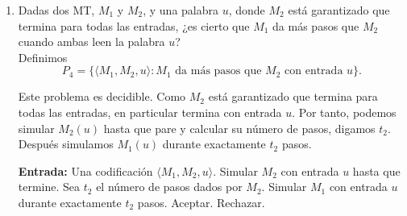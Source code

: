 \documentclass[12pt]{article}
\begin{document}
\begin{ejercicio}[2.4 puntos]
\begin{enumerate}
            Si $M$ no acepta $w$, entonces $N_1$ no acepta ninguna palabra. Por tanto,
            la condición de $P_3$ se cumple trivialmente, ya que no hay palabras aceptadas
            por $N_1$. \\

            Si $M$ acepta $w$, entonces $N_1$ acepta $\varepsilon$ en cierto número $t_1$
            de pasos, pero $N_2$ no acepta $\varepsilon$ en ningún número de pasos. Por
            tanto, la condición de $P_3$ falla. \\

            Así,
            $$
            \langle M,w\rangle\in C\text{-UNIVERSAL}
            \Longleftrightarrow
            \langle N_1,N_2\rangle\in P_3.
            $$

            Luego $C\text{-UNIVERSAL}\propto P_3$. Como $C\text{-UNIVERSAL}$ no es
            semidecidible, $P_3$ no es semidecidible. En particular, $P_3$ no es decidible.

            \newpage

            \item Dadas dos MT, $M_1$ y $M_2$, y una palabra $u$, donde $M_2$ está garantizado que termina para todas las entradas, 
            ¿es cierto que $M_1$ da más pasos que $M_2$ cuando ambas leen la palabra $u$? \\

            Definimos
            $$
            P_4=\{\langle M_1,M_2,u\rangle : M_1 \text{ da más pasos que } M_2
            \text{ con entrada } u\}.
            $$

            Este problema es decidible. Como $M_2$ está garantizado que termina para todas
            las entradas, en particular termina con entrada $u$. Por tanto, podemos simular
            $M_2(u)$ hasta que pare y calcular su número de pasos, digamos $t_2$. \\

            Después simulamos $M_1(u)$ durante exactamente $t_2$ pasos.

            \begin{algorithm}
            \caption{$M_{P_4}$}
            \label{algorithm:p4-decidible}
            \begin{algorithmic}
            \State \textbf{Entrada:} Una codificación $\langle M_1,M_2,u\rangle$.
            \State Simular $M_2$ con entrada $u$ hasta que termine.
            \State Sea $t_2$ el número de pasos dados por $M_2$.
            \State Simular $M_1$ con entrada $u$ durante exactamente $t_2$ pasos.
                \State Aceptar.
            \Else
                \State Rechazar.
            \EndIf
            \end{algorithmic}
            \end{algorithm}


\end{enumerate}
\end{ejercicio}
\end{document}
